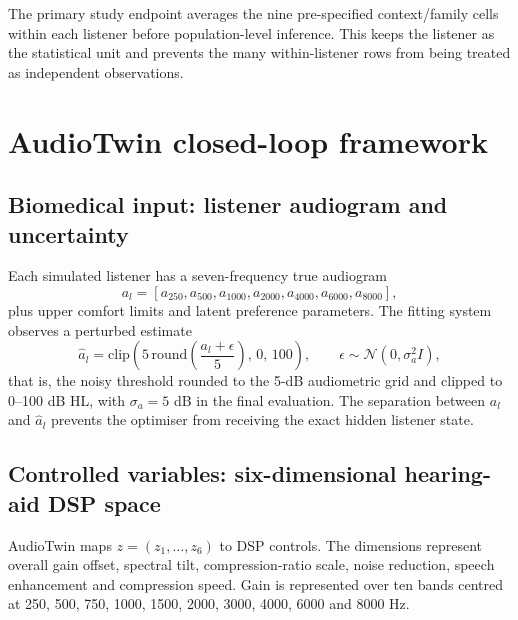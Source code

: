 \documentclass[preprint,12pt]{elsarticle}
\begin{document}
The primary study endpoint averages the nine pre-specified context/family cells within each listener before population-level inference. This keeps the listener as the statistical unit and prevents the many within-listener rows from being treated as independent observations.

\section{AudioTwin closed-loop framework}
\label{sec:framework}

\subsection{Biomedical input: listener audiogram and uncertainty}

Each simulated listener has a seven-frequency true audiogram
\begin{equation}
 a_l=[a_{250},a_{500},a_{1000},a_{2000},a_{4000},a_{6000},a_{8000}],
\end{equation}
plus upper comfort limits and latent preference parameters. The fitting system observes a perturbed estimate
\begin{equation}
    \hat a_l=\mathrm{clip}\!\left(5\,\mathrm{round}\!\left(\frac{a_l+\epsilon}{5}\right),\,0,\,100\right),\qquad \epsilon\sim\mathcal N(0,\sigma_a^2I),
    \label{eq:audiogram-noise}
\end{equation}
that is, the noisy threshold rounded to the 5-dB audiometric grid and clipped to 0--100 dB HL, with $\sigma_a=5$ dB in the final evaluation. The separation between $a_l$ and $\hat a_l$ prevents the optimiser from receiving the exact hidden listener state.

\subsection{Controlled variables: six-dimensional hearing-aid DSP space}

AudioTwin maps $z=(z_1,\ldots,z_6)$ to DSP controls. The dimensions represent overall gain offset, spectral tilt, compression-ratio scale, noise reduction, speech enhancement and compression speed. Gain is represented over ten bands centred at 250, 500, 750, 1000, 1500, 2000, 3000, 4000, 6000 and 8000 Hz.
\end{document}
